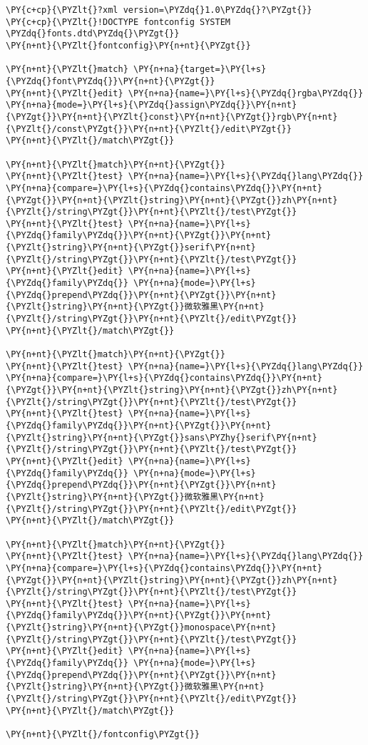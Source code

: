 \begin{Verbatim}[commandchars=\\\{\}]
\PY{c+cp}{\PYZlt{}?xml version=\PYZdq{}1.0\PYZdq{}?\PYZgt{}}
\PY{c+cp}{\PYZlt{}!DOCTYPE fontconfig SYSTEM \PYZdq{}fonts.dtd\PYZdq{}\PYZgt{}}
\PY{n+nt}{\PYZlt{}fontconfig}\PY{n+nt}{\PYZgt{}}

\PY{n+nt}{\PYZlt{}match} \PY{n+na}{target=}\PY{l+s}{\PYZdq{}font\PYZdq{}}\PY{n+nt}{\PYZgt{}}
\PY{n+nt}{\PYZlt{}edit} \PY{n+na}{name=}\PY{l+s}{\PYZdq{}rgba\PYZdq{}} \PY{n+na}{mode=}\PY{l+s}{\PYZdq{}assign\PYZdq{}}\PY{n+nt}{\PYZgt{}}\PY{n+nt}{\PYZlt{}const}\PY{n+nt}{\PYZgt{}}rgb\PY{n+nt}{\PYZlt{}/const\PYZgt{}}\PY{n+nt}{\PYZlt{}/edit\PYZgt{}}
\PY{n+nt}{\PYZlt{}/match\PYZgt{}}

\PY{n+nt}{\PYZlt{}match}\PY{n+nt}{\PYZgt{}}
\PY{n+nt}{\PYZlt{}test} \PY{n+na}{name=}\PY{l+s}{\PYZdq{}lang\PYZdq{}} \PY{n+na}{compare=}\PY{l+s}{\PYZdq{}contains\PYZdq{}}\PY{n+nt}{\PYZgt{}}\PY{n+nt}{\PYZlt{}string}\PY{n+nt}{\PYZgt{}}zh\PY{n+nt}{\PYZlt{}/string\PYZgt{}}\PY{n+nt}{\PYZlt{}/test\PYZgt{}}
\PY{n+nt}{\PYZlt{}test} \PY{n+na}{name=}\PY{l+s}{\PYZdq{}family\PYZdq{}}\PY{n+nt}{\PYZgt{}}\PY{n+nt}{\PYZlt{}string}\PY{n+nt}{\PYZgt{}}serif\PY{n+nt}{\PYZlt{}/string\PYZgt{}}\PY{n+nt}{\PYZlt{}/test\PYZgt{}}
\PY{n+nt}{\PYZlt{}edit} \PY{n+na}{name=}\PY{l+s}{\PYZdq{}family\PYZdq{}} \PY{n+na}{mode=}\PY{l+s}{\PYZdq{}prepend\PYZdq{}}\PY{n+nt}{\PYZgt{}}\PY{n+nt}{\PYZlt{}string}\PY{n+nt}{\PYZgt{}}微软雅黑\PY{n+nt}{\PYZlt{}/string\PYZgt{}}\PY{n+nt}{\PYZlt{}/edit\PYZgt{}}
\PY{n+nt}{\PYZlt{}/match\PYZgt{}}

\PY{n+nt}{\PYZlt{}match}\PY{n+nt}{\PYZgt{}}
\PY{n+nt}{\PYZlt{}test} \PY{n+na}{name=}\PY{l+s}{\PYZdq{}lang\PYZdq{}} \PY{n+na}{compare=}\PY{l+s}{\PYZdq{}contains\PYZdq{}}\PY{n+nt}{\PYZgt{}}\PY{n+nt}{\PYZlt{}string}\PY{n+nt}{\PYZgt{}}zh\PY{n+nt}{\PYZlt{}/string\PYZgt{}}\PY{n+nt}{\PYZlt{}/test\PYZgt{}}
\PY{n+nt}{\PYZlt{}test} \PY{n+na}{name=}\PY{l+s}{\PYZdq{}family\PYZdq{}}\PY{n+nt}{\PYZgt{}}\PY{n+nt}{\PYZlt{}string}\PY{n+nt}{\PYZgt{}}sans\PYZhy{}serif\PY{n+nt}{\PYZlt{}/string\PYZgt{}}\PY{n+nt}{\PYZlt{}/test\PYZgt{}}
\PY{n+nt}{\PYZlt{}edit} \PY{n+na}{name=}\PY{l+s}{\PYZdq{}family\PYZdq{}} \PY{n+na}{mode=}\PY{l+s}{\PYZdq{}prepend\PYZdq{}}\PY{n+nt}{\PYZgt{}}\PY{n+nt}{\PYZlt{}string}\PY{n+nt}{\PYZgt{}}微软雅黑\PY{n+nt}{\PYZlt{}/string\PYZgt{}}\PY{n+nt}{\PYZlt{}/edit\PYZgt{}}
\PY{n+nt}{\PYZlt{}/match\PYZgt{}}

\PY{n+nt}{\PYZlt{}match}\PY{n+nt}{\PYZgt{}}
\PY{n+nt}{\PYZlt{}test} \PY{n+na}{name=}\PY{l+s}{\PYZdq{}lang\PYZdq{}} \PY{n+na}{compare=}\PY{l+s}{\PYZdq{}contains\PYZdq{}}\PY{n+nt}{\PYZgt{}}\PY{n+nt}{\PYZlt{}string}\PY{n+nt}{\PYZgt{}}zh\PY{n+nt}{\PYZlt{}/string\PYZgt{}}\PY{n+nt}{\PYZlt{}/test\PYZgt{}}
\PY{n+nt}{\PYZlt{}test} \PY{n+na}{name=}\PY{l+s}{\PYZdq{}family\PYZdq{}}\PY{n+nt}{\PYZgt{}}\PY{n+nt}{\PYZlt{}string}\PY{n+nt}{\PYZgt{}}monospace\PY{n+nt}{\PYZlt{}/string\PYZgt{}}\PY{n+nt}{\PYZlt{}/test\PYZgt{}}
\PY{n+nt}{\PYZlt{}edit} \PY{n+na}{name=}\PY{l+s}{\PYZdq{}family\PYZdq{}} \PY{n+na}{mode=}\PY{l+s}{\PYZdq{}prepend\PYZdq{}}\PY{n+nt}{\PYZgt{}}\PY{n+nt}{\PYZlt{}string}\PY{n+nt}{\PYZgt{}}微软雅黑\PY{n+nt}{\PYZlt{}/string\PYZgt{}}\PY{n+nt}{\PYZlt{}/edit\PYZgt{}}
\PY{n+nt}{\PYZlt{}/match\PYZgt{}}

\PY{n+nt}{\PYZlt{}/fontconfig\PYZgt{}}
\end{Verbatim}
